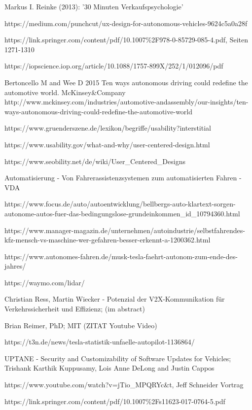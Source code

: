 \begin{thebibliography}{00}
Markus I. Reinke (2013): '30 Minuten Verkaufspsychologie'

https://medium.com/punchcut/ux-design-for-autonomous-vehicles-9624c5a0a28f

https://link.springer.com/content/pdf/10.1007\%2F978-0-85729-085-4.pdf, Seiten 1271-1310

https://iopscience.iop.org/article/10.1088/1757-899X/252/1/012096/pdf

Bertoncello M and Wee D 2015 Ten ways autonomous driving could redefine the automotive
world. McKinsey\&Company http://www.mckinsey.com/industries/automotive-andassembly/our-insights/ten-ways-autonomous-driving-could-redefine-the-automotive-world 

https://www.gruenderszene.de/lexikon/begriffe/usability?interstitial

https://www.usability.gov/what-and-why/user-centered-design.html

https://www.seobility.net/de/wiki/User\_Centered\_Designs

Automatisierung - Von Fahrerassistenzsystemen zum automatisierten Fahren - VDA

https://www.focus.de/auto/autoentwicklung/bellbergs-auto-klartext-sorgen-autonome-autos-fuer-das-bedingungslose-grundeinkommen\_id\_10794360.html

https://www.manager-magazin.de/unternehmen/autoindustrie/selbstfahrendes-kfz-mensch-vs-maschine-wer-gefahren-besser-erkennt-a-1200362.html

https://www.autonomes-fahren.de/musk-tesla-faehrt-autonom-zum-ende-des-jahres/

https://waymo.com/lidar/

Christian Ress, Martin Wiecker - Potenzial der V2X-Kommunikation für Verkehrssicherheit und Effizienz; (im abstract)

Brian Reimer, PhD; MIT (ZITAT Youtube Video)

https://t3n.de/news/tesla-statistik-unfaelle-autopilot-1136864/

UPTANE - Security and Customizability of Software Updates for Vehicles; Trishank Karthik Kuppusamy, Lois Anne DeLong and Justin Cappos

https://www.youtube.com/watch?v=jTio\_MPQRYc\&t, Jeff Schneider Vortrag

https://link.springer.com/content/pdf/10.1007\%2Fs11623-017-0764-5.pdf\\

\end{thebibliography}

